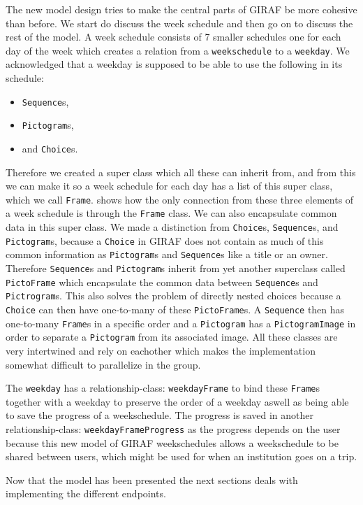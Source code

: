 The new model design tries to make the central parts of GIRAF be more cohesive than before.
We start do discuss the week schedule and then go on to discuss the rest of the model.
 A week schedule consists of 7 smaller schedules one for each day of the week which creates a relation from a \texttt{weekschedule} to a \texttt{weekday}.
We acknowledged that a weekday is supposed to be able to use the following in its schedule: 
\begin{itemize}
	\item \texttt{Sequence}s,
	\item \texttt{Pictogram}s,
	\item and \texttt{Choice}s.
\end{itemize}
Therefore we created a super class which all these can inherit from, and from this we can make it so a week schedule for each day has a list of this super class, which we call \texttt{Frame}.
 shows how the only connection from these three elements of a week schedule is through the \texttt{Frame} class.
We can also encapsulate common data in this super class.
We made a distinction from \texttt{Choice}s, \texttt{Sequence}s, and \texttt{Pictogram}s, because a \texttt{Choice} in GIRAF does not contain as much of this common information as \texttt{Pictogram}s and \texttt{Sequence}s like a title or an owner.
Therefore \texttt{Sequence}s and \texttt{Pictogram}s inherit from yet another superclass called \texttt{PictoFrame} which encapsulate the common data between \texttt{Sequence}s and \texttt{Pictrogram}s.
This also solves the problem of directly nested choices because a \texttt{Choice} can then have one-to-many of these \texttt{PictoFrame}s.
A \texttt{Sequence} then has one-to-many \texttt{Frame}s in a specific order and a \texttt{Pictogram} has a \texttt{PictogramImage} in order to separate a \texttt{Pictogram} from its associated image.
All these classes are very intertwined and rely on eachother which makes the implementation somewhat difficult to parallelize in the group.

The \texttt{weekday} has a relationship-class: \texttt{weekdayFrame} to bind these \texttt{Frame}s together with a weekday to preserve the order of a weekday aswell as being able to save the progress of a weekschedule.
The progress is saved in another relationship-class: \texttt{weekdayFrameProgress} as the progress depends on the user because this new model of GIRAF weekschedules allows a weekschedule to be shared between users, which might be used for when an institution goes on a trip.

Now that the model has been presented the next sections deals with implementing the different endpoints.